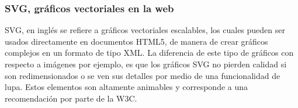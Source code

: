 \subsubsection{SVG, gráficos vectoriales en la web} %
\label{ssub:svg_graficos_vectoriales_en_la_web}

SVG, en inglés se refiere a gráficos vectoriales escalables, los cuales pueden ser usados directamente en documentos HTML5, de manera de crear gráficos complejos en un formato de tipo XML. La diferencia de este tipo de gráficos con respecto a imágenes por ejemplo, es que los gráficos SVG no pierden calidad si son redimensionados o se ven sus detalles por medio de una funcionalidad de lupa. Estos elementos son altamente animables y corresponde a una recomendación por parte de la W3C\cite{w3c}.




